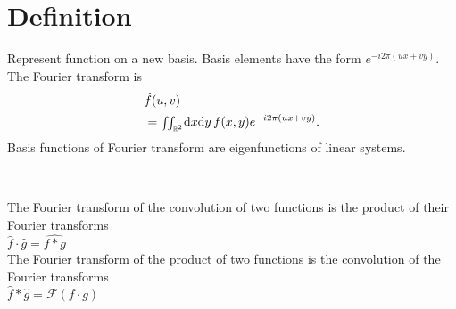 \section{Definition}
Represent function on a new basis. Basis elements have the form $e^{-i2\pi(ux+vy)}$. The Fourier transform is
\begin{align*}
	&\hat{f}(u,v)\\&={\scriptstyle\iint_{\mathbb{R}^2}}^{}\mathrm d x\mathrm d y\, f(x,y) e^{-i2\pi (ux+vy)}.
\end{align*}
Basis functions of Fourier transform are eigenfunctions of linear systems.
\begin{compactdesc}
	\item[\lp{Important functions}]\mbox\\
\item[\lp{Convolution theorem}] \hfill\\
	\begin{enumerate*}[label=\protect\circled{\arabic*},itemjoin=]
		\item The Fourier transform of the convolution of two functions is the product of their Fourier transforms\\
				$\hat{f}\cdot\hat{g}=\widehat{f* g}$\\
			The Fourier transform of the product of two functions is the convolution of the Fourier transforms\\
				$\hat{f}*\hat{g}=\mathcal{F}(f\cdot g)$\\
	\end{enumerate*}

\end{compactdesc}
